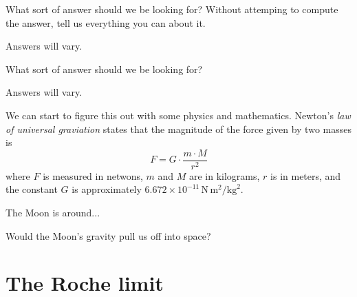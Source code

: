 \documentclass{ximera}
\begin{document}
\begin{question}
What sort of answer should we be looking for? Without attemping to
compute the answer, tell us everything you can about it.
\begin{freeResponse}
Answers will vary. 
\end{freeResponse}
\end{question}

\begin{question}
What sort of answer should we be looking for? 
\begin{freeResponse}
Answers will vary. 
\end{freeResponse}
\end{question}


We can start to figure this out with some physics and mathematics.
Newton's \textit{law of universal graviation} states that the
magnitude of the force given by two masses is
\[
F = G \cdot \frac{m\cdot M}{r^2} 
\]
where $F$ is measured in netwons, $m$ and $M$ are in kilograms, $r$ is
in meters, and the constant $G$ is approximately $6.672\times
10^{-11}\, \mathrm{N}\, \mathrm{m}^2/\mathrm{kg}^2$.

The Moon is around...






\begin{question}
Would the Moon's gravity pull us off into space? 
\end{question}

\section{The Roche limit} %
\end{document}
